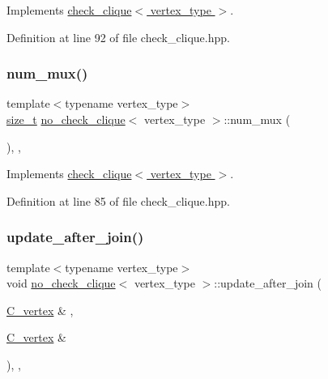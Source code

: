 Implements \hyperlink{structcheck__clique_a8355d3ba6eb71d487ffc36d48274db73}{check\+\_\+clique$<$ vertex\+\_\+type $>$}.



Definition at line 92 of file check\+\_\+clique.\+hpp.

\mbox{\label{structno__check__clique_a1cd60108ede385b43774d331e407a4dc}} 
\subsubsection{\texorpdfstring{num\+\_\+mux()}{num\_mux()}}
{\footnotesize\ttfamily template$<$typename vertex\+\_\+type$>$ \\
\hyperlink{tutorial__fpt__2017_2intro_2sixth_2test_8c_a7c94ea6f8948649f8d181ae55911eeaf}{size\+\_\+t} \hyperlink{structno__check__clique}{no\+\_\+check\+\_\+clique}$<$ vertex\+\_\+type $>$\+::num\+\_\+mux (\begin{DoxyParamCaption}{ }\end{DoxyParamCaption})\hspace{0.3cm}{\ttfamily [inline]}, {\ttfamily [override]}, {\ttfamily [virtual]}}



Implements \hyperlink{structcheck__clique_af124519bb9bb0f5476b38a20b8a7303b}{check\+\_\+clique$<$ vertex\+\_\+type $>$}.



Definition at line 85 of file check\+\_\+clique.\+hpp.

\mbox{\label{structno__check__clique_a471b7884a66663db6a478c3a80b47b48}} 
\subsubsection{\texorpdfstring{update\+\_\+after\+\_\+join()}{update\_after\_join()}}
{\footnotesize\ttfamily template$<$typename vertex\+\_\+type$>$ \\
void \hyperlink{structno__check__clique}{no\+\_\+check\+\_\+clique}$<$ vertex\+\_\+type $>$\+::update\+\_\+after\+\_\+join (\begin{DoxyParamCaption}\item[{\hyperlink{clique__covering__graph_8hpp_a9cb45047ea8c5ed95a8cfa90494345aa}{C\+\_\+vertex} \&}]{,  }\item[{\hyperlink{clique__covering__graph_8hpp_a9cb45047ea8c5ed95a8cfa90494345aa}{C\+\_\+vertex} \&}]{ }\end{DoxyParamCaption})\hspace{0.3cm}{\ttfamily [inline]}, {\ttfamily [override]}, {\ttfamily [virtual]}}



